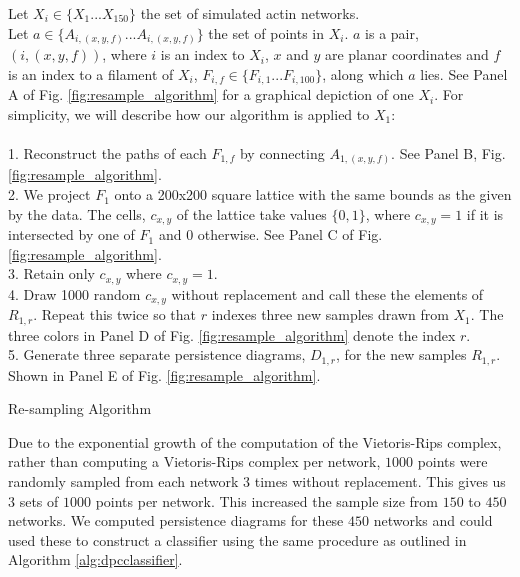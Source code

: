\documentclass[10pt]{article}
\begin{document}
\begin{algorithm}[!htbp]
	Let $X_i \in \{X_1...X_{150}\}$ the set of simulated actin networks. \\
    Let $a \in \{A_{i,(x,y,f)}...A_{i,(x,y,f)}\}$ the set of points in $X_i$. $a$ is a pair, $(i, (x,y,f))$, where $i$ is an index to $X_i$, $x$ and $y$ are planar coordinates and $f$ is an index to a filament of $X_i$, $F_{i,f} \in \{F_{i,1}...F_{i,100}\}$, along which $a$ lies. See Panel A of Fig. \ref{fig:resample_algorithm} for a graphical depiction of one $X_i$. For simplicity, we will describe how our algorithm is applied to $X_1$:\\\\
	1. Reconstruct the paths of each $F_{1,f}$ by connecting $A_{1,(x,y,f)}$. See Panel B, Fig. \ref{fig:resample_algorithm}.\\
	2. We project $F_1$ onto a 200x200 square lattice with the same bounds as the given by the data. The cells, $c_{x,y}$ of the lattice take values $\{0,1\}$, where $c_{x,y}=1$ if it is intersected by one of $F_1$ and 0 otherwise. See Panel C of Fig. \ref{fig:resample_algorithm}.\\
	3. Retain only $c_{x,y}$ where $c_{x,y}=1$.\\
	4. Draw 1000 random $c_{x,y}$ without replacement and call these the elements of $R_{1, r}$. Repeat this twice so that $r$ indexes three new samples drawn from $X_1$. The three colors in Panel D of Fig. \ref{fig:resample_algorithm} denote the index $r$.\\
	5. Generate three separate persistence diagrams, $D_{1,r}$, for the new samples $R_{1,r}$. Shown in Panel E of Fig. \ref{fig:resample_algorithm}.
	\caption{Re-sampling Algorithm}
	\label{alg:resample}
\end{algorithm}

Due to the exponential growth of the computation of the Vietoris-Rips complex, rather than computing a Vietoris-Rips complex per network, $1000$ points were randomly sampled from each network $3$ times without replacement. This gives us $3$ sets of $1000$ points per network. This increased the sample size from $150$ to $450$ networks. We computed persistence diagrams for these $450$ networks and could used these to construct a classifier using the same procedure as outlined in Algorithm \ref{alg:dpcclassifier}.
\end{document}
